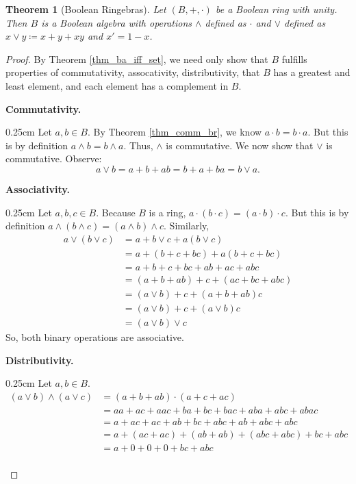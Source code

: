 \documentclass[10pt, letterpaper]{article}
\newenvironment{tabOver}[1]
{\begin{adjustwidth}{#1cm}{}}{\end{adjustwidth}}
\newtheorem{theorem}{Theorem}
\theoremstyle{definition}
\begin{document}
\begin{theorem}[Boolean Ringebras]
	Let \((B, +, \cdot)\) be a Boolean ring with unity. Then
	\(B\) is a Boolean algebra with operations \(\wedge\) defined as \(\cdot\) and
	\(\vee\) defined as \(x\vee y\coloneqq x+y+xy\) and \(x'=1-x\).
\end{theorem}
\begin{proof}
	By Theorem \ref{thm_ba_iff_set}, we need only show that
	\(B\) fulfills properties of commutativity, assocativity,
	distributivity, that \(B\) has a greatest and least element,
	and each element has a complement in \(B\).

	\textbf{Commutativity.}
	\begin{tabOver}{0.25}
		Let \(a,b\in B\). 
		By Theorem \ref{thm_comm_br}, we know \(a\cdot b = b\cdot a\).
		But this is by definition \(a\wedge b = b\wedge a\). Thus, \(\wedge\) is commutative.
		We now show that \(\vee\) is commutative. Observe:
		\[a\vee b = a + b + ab = b + a + ba = b\vee a.\]
	\end{tabOver}
	\textbf{Associativity.}
	\begin{tabOver}{0.25}
		Let \(a,b,c\in B\).
		Because \(B\) is a ring, \(a\cdot (b\cdot c) = (a\cdot b)\cdot c\).
		But this is by definition \(a\wedge (b\wedge c)=(a\wedge b)\wedge c\).
		Similarly,
		\begin{align*}
			a\vee(b\vee c)&=a + b\vee c + a(b\vee c) \\
						  &=a + (b + c + bc) + a(b + c + bc) \\
						  &=a + b + c + bc + ab + ac + abc \\
						  &=(a + b + ab) + c + (ac + bc + abc)\\
						  &=(a\vee b) + c + (a + b + ab)c\\
						  &=(a\vee b) + c + (a\vee b)c\\
						  &=(a\vee b)\vee c
		\end{align*}
		So, both binary operations are associative.
	\end{tabOver}
	\textbf{Distributivity.}
	\begin{tabOver}{0.25}
	Let \(a,b\in B\).
	\begin{align*}
		(a\vee b)\wedge(a\vee c)&=(a+b+ab)\cdot(a+c+ac)\\
				&=aa+ac+aac + ba+bc+bac + aba+abc+abac\\
				&=a+ac+ac + ab+bc+abc + ab+abc+abc\\
				&=a + (ac+ac) + (ab+ab) + (abc+abc) + bc + abc \\
				&=a + 0 + 0 + 0 + bc + abc\\

\end{align*}
\end{tabOver}
\end{proof}
\end{document}

